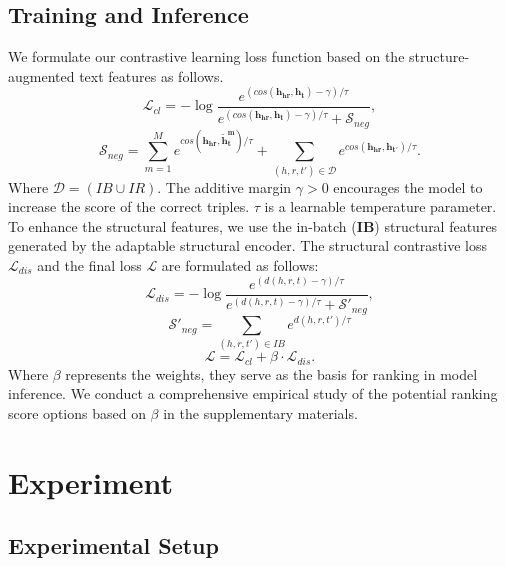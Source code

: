 \documentclass[11pt]{article}
\begin{document}
\subsection{Training and Inference}
We formulate our contrastive learning loss function based on the structure-augmented text features as follows.
\begin{equation} \label{eq:infonce}
    \mathcal{L}_{cl} = -\log \frac{e^{(cos(\mathbf{h_{hr}}, \mathbf{h_{t}})-\gamma)/\tau}} {e^{(cos(\mathbf{h_{hr}}, \mathbf{h_{t}})-\gamma)/\tau} + \mathcal{S}_{neg}},
\end{equation}
\begin{equation} \label{eq:infonce}
    \mathcal{S}_{neg} = \sum_{m=1}^Me^ {cos(\mathbf{h_{hr}},\mathbf{\tilde{h}^{m}_{t}})/ \tau}+\sum_{(h,r,t') \in \mathcal{D}}e^{cos(\mathbf{h_{hr}},\mathbf{h_{t'}})/\tau}.
\end{equation}
Where $\mathcal{D}=(IB \cup IR)$. The additive margin $\gamma > 0$ encourages the model to increase the score of the correct triples. $\tau$ is a learnable temperature parameter. To enhance the structural features, we use the in-batch (\textbf{IB}) structural features generated by the adaptable structural encoder. The structural contrastive loss $\mathcal{L}_{dis}$ and the final loss $\mathcal{L}$ are formulated as follows:
\begin{equation} \label{eq:infonce}
    \mathcal{L}_{dis} = -\log \frac{e^{(d(h,r,t)-\gamma)/\tau}} {e^{(d(h,r,t)-\gamma)/\tau} + \mathcal{S}'_{neg}},
\end{equation}
\begin{equation}
\mathcal{S}'_{neg}=\sum_{(h,r,t') \in IB}e^{d(h,r,t')/\tau}
\end{equation}
\begin{equation}
	\mathcal{L}= \mathcal{L}_{cl}+ \beta \cdot \mathcal{L}_{dis}.
\end{equation}
Where $\beta$ represents the weights, they serve as the basis for ranking in model inference. We conduct a comprehensive empirical study of the potential ranking score options based on $\beta$ in the
supplementary materials.

\section{Experiment}

\subsection{Experimental Setup}
\end{document}
